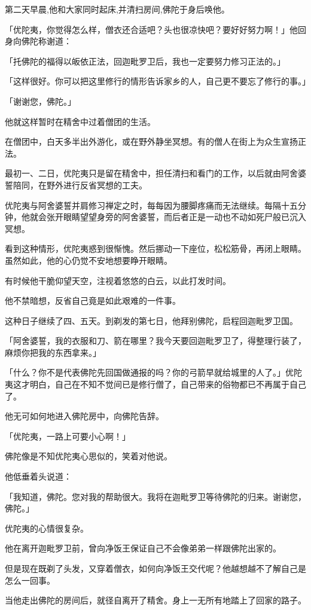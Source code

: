 \documentclass[twoside,openany]{book}
\begin{document}
第二天早晨,他和大家同时起床,并清扫房间,佛陀于身后唤他。

「优陀夷，你觉得怎么样，僧衣还合适吧？头也很凉快吧？要好好努力啊！」他回身向佛陀称谢道：

「托佛陀的福得以皈依正法，回迦毗罗卫后，我也一定要努力修习正法的。」

「这样很好。你可以把这里修行的情形告诉家乡的人，自己更不要忘了修行的事。」

「谢谢您，佛陀。」

他就这样暂时在精舍中过着僧团的生活。

在僧团中，白天多半出外游化，或在野外静坐冥想。有的僧人在街上为众生宣扬正法。

最初一、二日，优陀夷只是留在精舍中，担任清扫和看门的工作，以后就由阿舍婆誓陪同，在野外进行反省冥想的工夫。

优陀夷与阿舍婆誓并肩修习禅定之时，每每因为腰脚疼痛而无法继续。每隔十五分钟，他就会张开眼睛望望身旁的阿舍婆誓，而后者正是一动也不动如死尸般已沉入冥想。

看到这种情形，优陀夷惑到很惭愧。然后挪动一下座位，松松筋骨，再闭上眼睛。虽然如此，他的心仍觉不安地想要睁开眼睛。

有时候他干脆仰望天空，注视着悠悠的白云，以此打发时间。

他不禁暗想，反省自己竟是如此艰难的一件事。

这种日子继续了四、五天。到剃发的第七日，他拜别佛陀，启程回迦毗罗卫国。

「阿舍婆誓，我的衣服和刀、箭在哪里？我今天要回迦毗罗卫了，得整理行装了，麻烦你把我的东西拿来。」

「什么？你不是代表佛陀先回国做通报的吗？你的弓箭早就给城里的人了。」优陀夷这才明白，自己在不知不觉间已是修行僧了，自己带来的俗物都已不再属于自己了。

他无可如何地进入佛陀房中，向佛陀告辞。

「优陀夷，一路上可要小心啊！」

佛陀像是不知优陀夷心思似的，笑着对他说。

他低垂着头说道：

「我知道，佛陀。您对我的帮助很大。我将在迦毗罗卫等待佛陀的归来。谢谢您，佛陀。」

优陀夷的心情很复杂。

他在离开迦毗罗卫前，曾向净饭王保证自己不会像弟弟一样跟佛陀出家的。

但是现在既剃了头发，又穿着僧衣，如何向净饭王交代呢？他越想越不了解自己是怎么一回事。

当他走出佛陀的房间后，就径自离开了精舍。身上一无所有地踏上了回家的路子。
\end{document}
